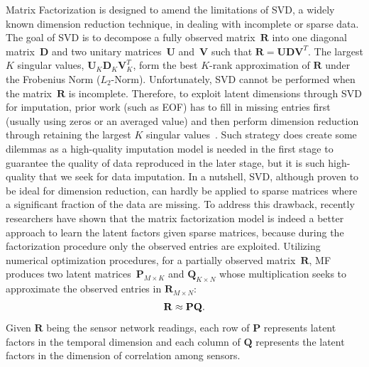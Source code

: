 Matrix Factorization is designed to amend the limitations of SVD, a widely known dimension reduction technique, 
in dealing with incomplete or sparse data.
The goal of SVD is to decompose a fully observed matrix~$\mathbf{R}$ into one diagonal matrix~$\mathbf{D}$ and two unitary matrices~$\mathbf{U}$ and~$\mathbf{V}$ such that
$\mathbf{R} = \mathbf{U}\mathbf{D}\mathbf{V}^T.$ %
The largest $K$ singular values, $\mathbf{U}_K \mathbf{D}_K \mathbf{V}_K^T$, form the best $K$-rank approximation of $\mathbf{R}$ under the Frobenius Norm ($L_2$-Norm). Unfortunately, SVD cannot be performed when the matrix~$\mathbf{R}$ is incomplete. 
Therefore, to exploit latent dimensions through SVD for imputation, prior work (such as EOF) has to fill in missing entries first 
(usually using zeros or an averaged value) and then perform dimension reduction through retaining the largest $K$ singular values~\cite{beckers2003eof}. 
Such strategy does create some dilemmas as a high-quality imputation model is needed in the first stage to guarantee the quality of 
data reproduced in the later stage, but it is such high-quality that we seek for data imputation. In a nutshell, SVD, although 
proven to be ideal for dimension reduction, can hardly be applied to sparse matrices where a significant fraction of 
the data are missing.
To address this drawback, recently researchers have shown \cite{koren2009matrix} that the matrix factorization model is indeed 
a better approach to learn the latent factors given sparse matrices, because during the factorization procedure only the observed entries are exploited.
Utilizing numerical optimization procedures, for a partially observed matrix~$\mathbf{R}$, MF produces two latent 
matrices~$\mathbf{P}_{M \times K}$ and $\mathbf{Q}_{K \times N}$ whose multiplication seeks to approximate the observed entries in $\mathbf{R}_{M \times N}$:
\begin{equation*}\small \mathbf{R} \approx \mathbf{P} \mathbf{Q}.\end{equation*}
Given $\mathbf{R}$ being the sensor network readings, each row of $\mathbf{P}$ represents latent factors in the temporal dimension and each column of $\mathbf{Q}$ represents the latent factors in the dimension of correlation among sensors.

